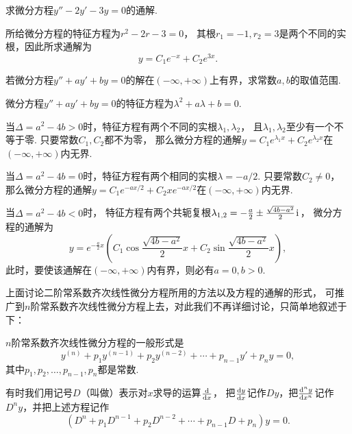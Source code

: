 \begin{example}
求微分方程\(y'' - 2y' - 3y = 0\)的通解.
\begin{solution}
所给微分方程的特征方程为\(r^2-2r-3=0\)，
其根\(r_1=-1, r_2=3\)是两个不同的实根，因此所求通解为\[
	y = C_1 e^{-x} + C_2 e^{3x}.
\]
\end{solution}
\end{example}

\begin{example}
若微分方程\(y''+ay'+by=0\)的解在\((-\infty,+\infty)\)上有界，求常数\(a,b\)的取值范围.
\begin{solution}
微分方程\(y''+ay'+by=0\)的特征方程为\(\lambda^2 + a\lambda+b = 0\).

当\(\Delta=a^2-4b>0\)时，特征方程有两个不同的实根\(\lambda_1,\lambda_2\)，
且\(\lambda_1,\lambda_2\)至少有一个不等于零.
只要常数\(C_1,C_2\)都不为零，
那么微分方程的通解\(y = C_1 e^{\lambda_1 x} + C_2 e^{\lambda_2 x}\)在\((-\infty,+\infty)\)内无界.

当\(\Delta=a^2-4b=0\)时，特征方程有两个相同的实根\(\lambda=-a/2\).
只要常数\(C_2\neq0\)，
那么微分方程的通解\(y = C_1 e^{-ax/2} + C_2 x e^{-ax/2}\)在\((-\infty,+\infty)\)内无界.

当\(\Delta=a^2-4b<0\)时，
特征方程有两个共轭复根\(\lambda_{1,2}=-\frac{a}{2}\pm\frac{\sqrt{4b-a^2}}{2}\kern1pt\mathrm{i}\kern1pt\)，
微分方程的通解为\[
	y = e^{-\frac{a}{2}x} \left( C_1 \cos\frac{\sqrt{4b-a^2}}{2}x + C_2 \sin\frac{\sqrt{4b-a^2}}{2}x \right),
\]
此时，要使该通解在\((-\infty,+\infty)\)内有界，则必有\(a = 0, b > 0\).
\end{solution}
\end{example}

上面讨论二阶常系数齐次线性微分方程所用的方法以及方程的通解的形式，
可推广到\(n\)阶常系数齐次线性微分方程上去，对此我们不再详细讨论，只简单地叙述于下：

\(n\)阶常系数齐次线性微分方程的一般形式是
\begin{equation}\label{equation:微分方程概论.n阶常系数齐次线性微分方程的一般形式}
	y^{(n)} + p_1 y^{(n-1)} + p_2 y^{(n-2)} + \dotsb + p_{n-1} y' + p_n y = 0,
\end{equation}
其中\(p_1,p_2,\dotsc,p_{n-1},p_n\)都是常数.

有时我们用记号\(D\)（叫做）表示对\(x\)求导的运算\(\dv{x}\)，
把\(\dv{y}{x}\)记作\(Dy\)，把\(\dv[n]{y}{x}\)记作\(D^n y\)，并把上述方程记作
\begin{equation}\label{equation:微分方程概论.n阶常系数齐次线性微分方程的一般形式.用微分算子改写}
	(D^n + p_1 D^{n-1} + p_2 D^{n-2} + \dotsb + p_{n-1} D + p_n) y = 0.
\end{equation}

